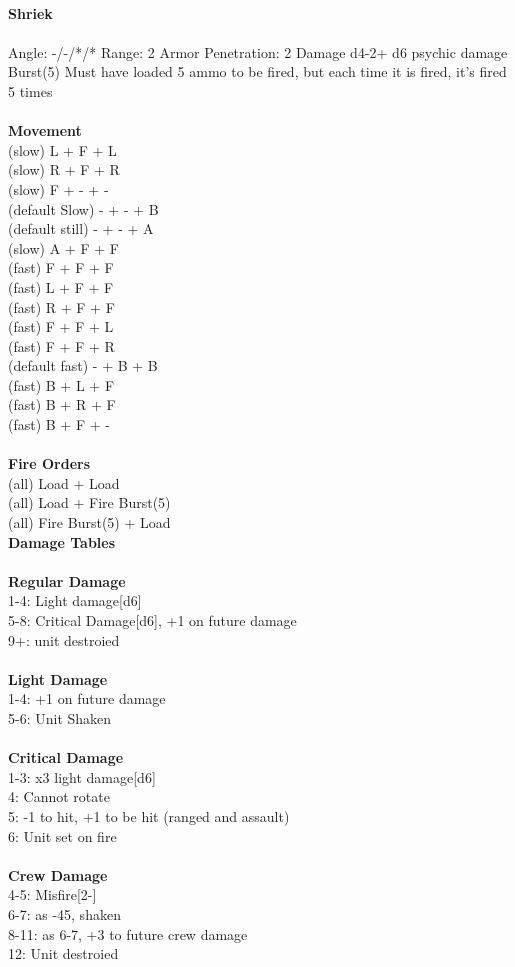 \ \\
{\bf Shriek } \\
\ \\
Angle: -/-/*/* Range: 2 Armor Penetration: 2 Damage d4-2+ d6 psychic damage \\
\indent Burst(5) Must have loaded 5 ammo to be fired, but each time it is fired, it's fired 5 times \\





\ \\ {\bf Movement } \\
(slow) L + F + L \\
(slow) R + F + R \\
(slow) F + - + - \\
(default Slow) - + - + B \\
(default still) - + - + A \\
(slow) A + F + F \\
(fast) F + F + F \\
(fast) L + F + F \\
(fast) R + F + F \\
(fast) F + F + L \\
(fast) F + F + R \\
(default fast) - + B + B \\
(fast) B + L + F \\
(fast) B + R + F \\
(fast) B + F + - \\
\ \\ {\bf Fire Orders } \\
(all) Load + Load \\
(all) Load + Fire Burst(5) \\
(all) Fire Burst(5) + Load \\



{\bf Damage Tables} \\
\ \\ {\bf Regular Damage } \\
1-4: Light damage[d6] \\
5-8: Critical Damage[d6], +1 on future damage \\
9+: unit destroied \\
\ \\ {\bf Light Damage } \\
1-4: +1 on future damage \\
5-6: Unit Shaken \\
\ \\ {\bf Critical Damage  } \\
1-3: x3 light damage[d6] \\
4: Cannot rotate \\
5: -1 to hit, +1 to be hit (ranged and assault) \\
6: Unit set on fire \\
\ \\ {\bf Crew Damage } \\
4-5: Misfire[2-] \\
6-7: as -45, shaken \\
8-11: as 6-7, +3 to future crew damage \\
12: Unit destroied \\


